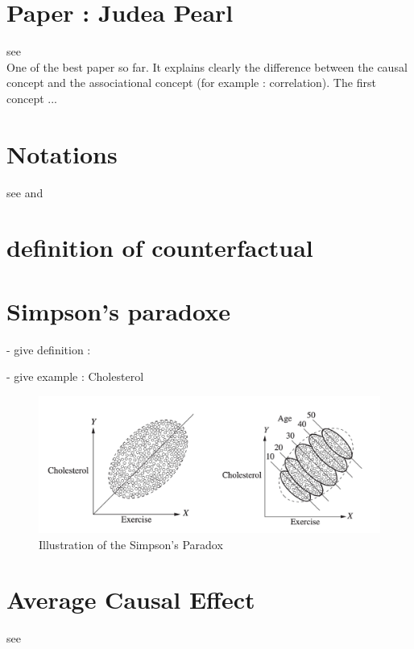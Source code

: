 \documentclass{article}
\begin{document}
 \cite{pearl2019seven} 

\section{Paper : Judea Pearl}

see \cite{pearl2010mathematics} \\
One of the best paper so far. It explains clearly the difference between the causal concept and the associational concept (for example : correlation). The first concept ...




\section{Notations}
see \cite{yao2020survey} and \cite{hernan2020causal}

\section{definition of counterfactual}

\section{Simpson's paradoxe}

- give definition :

- give example : Cholesterol  

\begin{figure}[h]
\centering
\includegraphics[width=0.8 \textwidth]{figures/simpson.png}
\caption{Illustration of the Simpson’s Paradox\cite{pearl2016causal}}
\end{figure}

\section{Average Causal Effect}

see \cite{hernan2020causal}
\end{document}
